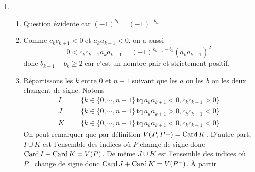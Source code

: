\begin{enumerate}
\begin{enumerate}
  \item Si $a_0<0$ alors $a_1<0$ et le raisonnement est identique
  avec des fonctions d{\'e}croissantes et n{\'e}gatives.
  \item Pla\c{c}ons nous dans le cas o{\`u} $a_0$ et $a_1$ sont
  strictement positifs avec $P'=X^{b_1-1}Q$ et $P'>0$ dans
  l'intervalle $[0,\alpha]$ de la question pr{\'e}c{\'e}dente. Notons
  $r_1$ la plus petite racine strictement positive de $P$.
  \newline
  $P$ est croissante et strictement positive dans $]0,\alpha]$
  donc $\alpha<r_1$ et $P'(\alpha)>0$. Mais $P'$ ne peut rester
  $>0$
  entre $\alpha$ et $r_1$ donc $P'$ doit s'annuler en un point qui
  est aussi un z{\'e}ro de $Q$. On traite l'autre cas en consid{\'e}rant
  le polyn{\^o}me $-P$.
  \item Ici $a_0$ et $a_1$ sont de m{\^e}me signe donc $V(P)=V(Q)$. On
  peut compter les multiplicit{\'e}s des racines de $Q$ :
    celles qui sont entre $r_1$ et $r_n$ et au moins une $<r_1$.
    On obtient
    \[n_+(Q)\geq (n_+(P)-1) + 1 = n_+(P)\]
    De la r{\`e}gle de Descartes {\`a} l'ordre $n-1$, on tire $n_+(Q)\leq
    V(Q)$ d'o{\`u}
    \[n_+(P)\leq n_+(Q)\leq V(Q)=V(P)\]
\end{enumerate}
\item
\begin{enumerate}
  \item Question {\'e}vidente car $(-1)^{b_k}=(-1)^{-b_k}$
  \item Comme $c_k c_{k+1}<0$ et $a_k a_{k+1}<0$, on a aussi
  \[0<c_k c_{k+1} a_k a_{k+1}=(-1)^{b_{k+1}-b_k}(a_ka_{k+1})^2\]
  donc $b_{k+1}-b_k\geq 2$ car c'est un nombre pair et strictement
  positif.
  \item Répartissons les $k$ entre 0 et $n-1$ suivant que les $a$ ou les $b$ ou les deux changent de signe. Notons
  \begin{eqnarray*}
  I &=& \{k \in \{0, \cdots, n-1\}\, \mathrm{tq} \, a_ka_{k+1}<0,c_kc_{k+1}>0\}\\
  J &=& \{k \in \{0, \cdots, n-1\}\, \mathrm{tq} \, a_ka_{k+1}>0,c_kc_{k+1}<0\}\\
  K &=& \{k \in \{0, \cdots, n-1\}\, \mathrm{tq} \, a_ka_{k+1}<0,c_kc_{k+1}<0\}
  \end{eqnarray*}
  On peut remarquer que par d{\'e}finition $V(P,P-)=\operatorname{Card} K$. D'autre
  part, $I \cup K$ est l'ensemble des indices o{\`u} $P$ change de
  signe donc $\operatorname{Card} I +\operatorname{Card} K =V(P) $. De m{\^e}me $J \cup K$ est l'ensemble des indices o{\`u} $P^-$
  change de signe donc $\operatorname{Card} J +\operatorname{Card} K =V(P^-) $. {\`A} partir

\end{enumerate}
\end{enumerate}
